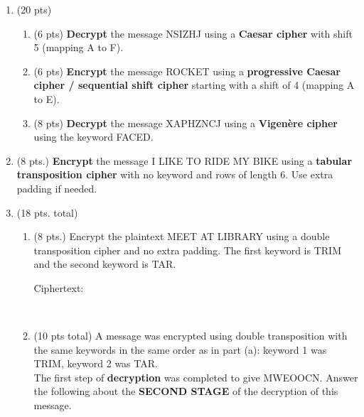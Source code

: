 \documentclass[12pt]{article}
\renewcommand{\emph}[1]{\textsf{\textbf{#1}}}
\begin{document}
\begin{enumerate}
\item (20 pts)
	\begin{enumerate}

	\item (6 pts) \emph{Decrypt} the message \textsf{NSIZHJ} using a \emph{Caesar cipher}
with
shift 5 (mapping A to F).
\vfill

	\item (6 pts) \emph{Encrypt} the message \textsf{ROCKET} using a \emph{ progressive Caesar
cipher / sequential shift cipher} starting with a shift of 4 (mapping A to E).
\vfill

	\item (8 pts) \emph{Decrypt} the message \textsf{XAPHZNCJ} using a \emph{Vigen\`ere cipher} using the keyword \textsf{FACED}.
\vfill

\vfill
	\end{enumerate}
\item (8 pts.)  \emph{Encrypt} the message \textsf{I LIKE TO RIDE MY BIKE} using a
\emph{tabular transposition cipher} with no keyword and rows of length
6. Use extra padding if needed. 
\vfill

\vfill
\newpage
\item (18 pts. total) 
	\begin{enumerate}
	\item (8 pts.) Encrypt the plaintext   \textsf{MEET AT LIBRARY} using a double transposition cipher and no extra padding. The first keyword is \textsf{TRIM} and the second keyword is \textsf{TAR}. 

Ciphertext: \underline{\hskip2.5in}

\ 
	\item  (10 pts total) A message was encrypted using double transposition with the same keywords in the same order as in part (a): keyword 1 was \textsf{TRIM}, keyword 2 was  \textsf{TAR}. \\
	
	The first step of \emph{decryption} was completed to give  \textsf{MWEOOCN}.
Answer the following about the \textbf{SECOND STAGE} of the decryption of this message.

\end{enumerate}
\end{enumerate}
\end{document}
